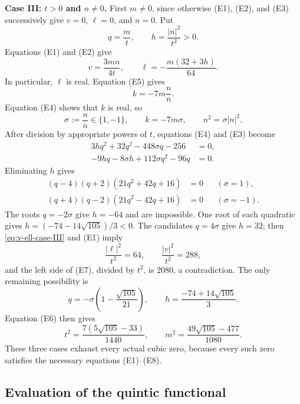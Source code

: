 \documentclass[11pt,reqno]{amsart}
\theoremstyle{remark}
\newcommand{\abs}[1]{\left\lvert #1\right\rvert}
\begin{document}
\medskip
\noindent\textbf{Case III: $t>0$ and $n\ne0$.}
First $m\ne0$, since otherwise (E1), (E2), and (E3) successively give
$v=0$, $\ell=0$, and $n=0$.  Put
\begin{equation}\label{eq:q-h}
q=\frac mt,
\qquad
h=\frac{\abs n^2}{t^2}>0.
\end{equation}
Equations (E1) and (E2) give
\begin{equation}\label{eq:v-ell-case-III}
v=\frac{3mn}{4t},
\qquad
\ell=-\frac{m(32+3h)}{64}.
\end{equation}
In particular, $\ell$ is real.  Equation (E5) gives
\[
k=-7m\frac n{\overline n}.
\]
Equation (E4) shows that $k$ is real, so
\begin{equation}\label{eq:sigma}
\sigma:=\frac n{\overline n}\in\{1,-1\},
\qquad
k=-7m\sigma,
\qquad
n^2=\sigma\abs n^2.
\end{equation}
After division by appropriate powers of $t$, equations (E4) and (E3) become
\begin{align}
3hq^2+32q^2-448\sigma q-256&=0,\label{eq:case-III-a}\\
-9hq-8\sigma h+112\sigma q^2-96q&=0.\label{eq:case-III-b}
\end{align}
Eliminating $h$ gives
\begin{align}
(q-4)(q+2)(21q^2+42q+16)&=0 &&(\sigma=1),\label{eq:resultant-plus}\\
(q+4)(q-2)(21q^2-42q+16)&=0 &&(\sigma=-1).
\label{eq:resultant-minus}
\end{align}
The roots $q=-2\sigma$ give $h=-64$ and are impossible.  One root of each
quadratic gives
$h=(-74-14\sqrt{105})/3<0$.  The candidates $q=4\sigma$ give $h=32$;
then \eqref{eq:v-ell-case-III} and (E1) imply
\[
\frac{\abs\ell^2}{t^2}=64,
\qquad
\frac{\abs v^2}{t^2}=288,
\]
and the left side of (E7), divided by $t^2$, is $2080$, a contradiction.
The only remaining possibility is
\begin{equation}\label{eq:case-III-qh}
q=-\sigma\left(1-\frac{\sqrt{105}}{21}\right),
\qquad
h=\frac{-74+14\sqrt{105}}3.
\end{equation}
Equation (E6) then gives
\begin{equation}\label{eq:case-III-tm}
t^2=\frac{7(5\sqrt{105}-33)}{1440},
\qquad
m^2=\frac{49\sqrt{105}-477}{1080}.
\end{equation}
These three cases exhaust every actual cubic zero, because every such zero
satisfies the necessary equations (E1)--(E8).

\subsection{Evaluation of the quintic functional}
\end{document}
